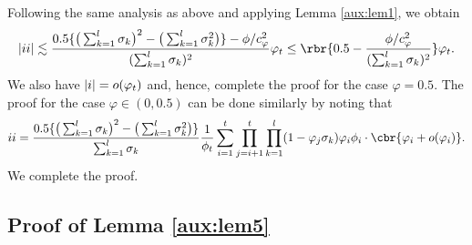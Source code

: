 Following the same analysis as above and applying Lemma \ref{aux:lem1}, we obtain
\begin{equation*}
|\uppercase\expandafter{\romannumeral2}| \lesssim \frac{0.5\{\big(\sum_{k=1}^l \sigma_k\big)^2-\big(\sum_{k=1}^l \sigma_k^2\big)\}-\phi/c_{\varphi}^2}{(\sum_{k=1}^{l}\sigma_k)^2} \varphi_t\leq \rbr{0.5 - \frac{\phi/c_{\varphi}^2}{(\sum_{k=1}^l\sigma_k)^2}} \varphi_t.
\end{equation*}
We also have $|\uppercase\expandafter{\romannumeral1}| = o(\varphi_t)$ and, hence, complete the proof for the case $\varphi=0.5$. The proof for the case $\varphi\in(0,0.5)$ can be done similarly by noting that
\begin{equation*}
\uppercase\expandafter{\romannumeral2} = \frac{0.5\{\big(\sum_{k=1}^l \sigma_k\big)^2-\big(\sum_{k=1}^l \sigma_k^2\big)\}}{\sum_{k=1}^{l}\sigma_k}\frac{1}{\phi_t} \sum_{i=1}^t\prod_{j=i+1}^t \prod_{k=1}^l (1-\varphi_j\sigma_k)\varphi_i\phi_i\cdot\cbr{\varphi_i+o(\varphi_i)}.
\end{equation*}
We complete the proof.


\subsection{Proof of Lemma \ref{aux:lem5}}

